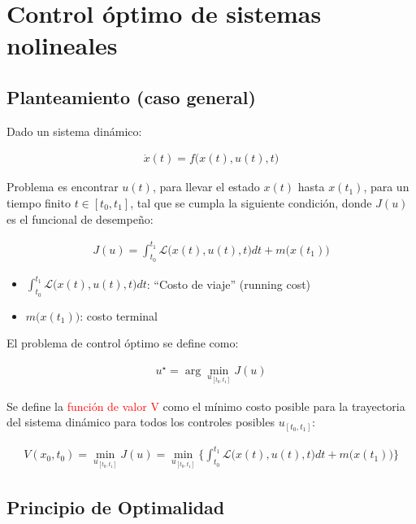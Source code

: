 \chapter{Control óptimo de sistemas nolineales}

\section{Planteamiento (caso general)}

Dado un sistema dinámico:

\begin{align*}
    \dot{x}(t)=f\big( x(t),u(t),t\big) 
\end{align*}

Problema es encontrar $u(t)$, para llevar el estado $x(t)$ hasta $x(t_1)$, para un tiempo finito $t\in[t_0,t_1]$, tal que se cumpla la siguiente condición, donde $J(u)$ es el funcional de desempeño:

\begin{align*}
    J(u) = \int_{t_0}^{t_1} \mathcal{L} \big( x(t), u(t), t \big) dt + m \big( x(t_1) \big)
\end{align*}

\begin{itemize}
    \item $\int_{t_0}^{t_1} \mathcal{L} \big(x(t),u(t),t\big)dt$: ``Costo de viaje'' (running cost)
    \item $m \big( x(t_1) \big)$: costo terminal
\end{itemize}

El problema de control óptimo se define como:

\begin{align*}
    u^\star = \arg \min_{u_{[t_0,t_1]}} J(u)
\end{align*}

Se define la \textcolor{red}{función de valor V} como el mínimo costo posible para la trayectoria del sistema dinámico para todos los controles posibles $u_{[t_0,t_1]}$:

\begin{align*}
    V(x_0,t_0) = \min_{u_{[t_0,t_1]}} J(u) = \min_{u_{[t_0,t_1]}} \Big\{\int_{t_0}^{t_1} \mathcal{L} \big(x(t),u(t),t\big)dt+m\big(x(t_1)\big)  \Big\}
\end{align*}

\section{Principio de Optimalidad}

